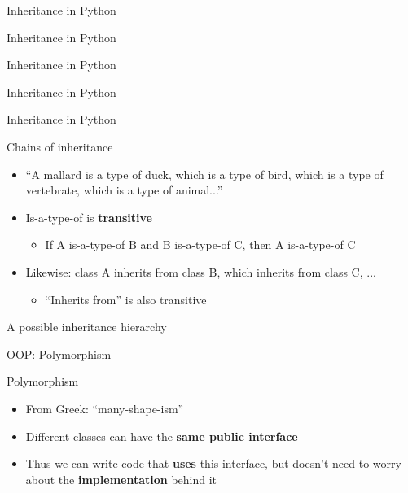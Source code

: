 \begin{frame}{Inheritance in Python}
\end{frame}

\begin{frame}{Inheritance in Python}
\end{frame}

\begin{frame}{Inheritance in Python}
\end{frame}

\begin{frame}{Inheritance in Python}
\end{frame}

\begin{frame}{Inheritance in Python}
\end{frame}

\begin{frame}{Chains of inheritance}
\begin{itemize}
	\pause\item ``A mallard is a type of duck, which is a type of bird, which is a type of vertebrate, which is a type of animal...''
	\pause\item Is-a-type-of is \textbf{transitive}
	\begin{itemize}
		\pause\item If A is-a-type-of B and B is-a-type-of C, then A is-a-type-of C
	\end{itemize}
	\pause\item Likewise: class A inherits from class B, which inherits from class C, ...
	\begin{itemize}
		\pause\item ``Inherits from'' is also transitive
	\end{itemize}
\end{itemize}
\end{frame}

\begin{frame}{A possible inheritance hierarchy}
\end{frame}

\begin{frame}{OOP: Polymorphism}
\end{frame}

\begin{frame}{Polymorphism}
\begin{itemize}
	\pause\item From Greek: ``many-shape-ism''
	\pause\item Different classes can have the \textbf{same public interface}
	\pause\item Thus we can write code that \textbf{uses} this interface, but doesn't need to worry about the \textbf{implementation} behind it
\end{itemize}
\end{frame}

